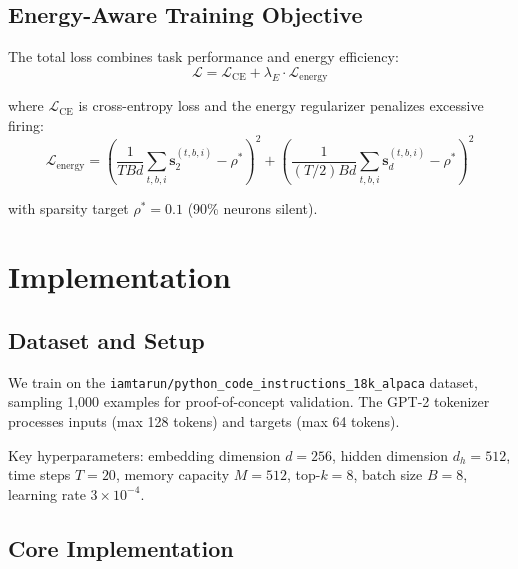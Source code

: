 \documentclass[11pt,a4paper]{article}
\newcommand{\spk}{\mathbf{s}}
\begin{document}
\subsection{Energy-Aware Training Objective}

The total loss combines task performance and energy efficiency:
\begin{equation}
    \mathcal{L} = \mathcal{L}_{\text{CE}} + \lambda_E \cdot \mathcal{L}_{\text{energy}}
\end{equation}

where $\mathcal{L}_{\text{CE}}$ is cross-entropy loss and the energy regularizer penalizes excessive firing:
\begin{equation}
    \mathcal{L}_{\text{energy}} = \left(\frac{1}{TBd}\sum_{t,b,i} \spk_2^{(t,b,i)} - \rho^*\right)^2 + \left(\frac{1}{(T/2)Bd}\sum_{t,b,i} \spk_d^{(t,b,i)} - \rho^*\right)^2
\end{equation}

with sparsity target $\rho^* = 0.1$ (90\% neurons silent).

\section{Implementation}

\subsection{Dataset and Setup}

We train on the \texttt{iamtarun/python\_code\_instructions\_18k\_alpaca} dataset, sampling 1,000 examples for proof-of-concept validation. The GPT-2 tokenizer processes inputs (max 128 tokens) and targets (max 64 tokens).

Key hyperparameters: embedding dimension $d=256$, hidden dimension $d_h=512$, time steps $T=20$, memory capacity $M=512$, top-$k=8$, batch size $B=8$, learning rate $3 \times 10^{-4}$.

\subsection{Core Implementation}
\end{document}
